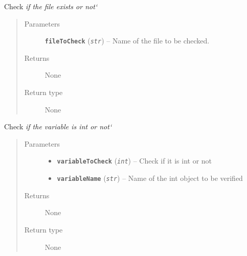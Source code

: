 \documentclass[letterpaper,10pt,english]{sphinxmanual}
\begin{document}

\begin{fulllineitems}
\label{iCallSV:iCallSV.checkparameters.checkFile}
Check \emph{if the file exists or not{}`}
\begin{quote}\begin{description}
\item[{Parameters}] \leavevmode
\textbf{\texttt{fileToCheck}} (\emph{\texttt{str}}) -- Name of the file to be checked.

\item[{Returns}] \leavevmode
None

\item[{Return type}] \leavevmode
None

\end{description}\end{quote}

\end{fulllineitems}


\begin{fulllineitems}
\label{iCallSV:iCallSV.checkparameters.checkInt}
Check \emph{if the variable is int or not{}`}
\begin{quote}\begin{description}
\item[{Parameters}] \leavevmode\begin{itemize}
\item {} 
\textbf{\texttt{variableToCheck}} (\emph{\texttt{int}}) -- Check if it is int or not

\item {} 
\textbf{\texttt{variableName}} (\emph{\texttt{str}}) -- Name of the int object to be verified

\end{itemize}

\item[{Returns}] \leavevmode
None

\item[{Return type}] \leavevmode
None

\end{description}\end{quote}

\end{fulllineitems}
\end{document}

